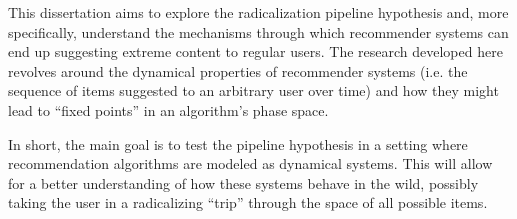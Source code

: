 This dissertation aims to explore the radicalization pipeline hypothesis and,
more specifically, understand the mechanisms through which recommender systems
can end up suggesting extreme content to regular users. The research developed
here revolves around the dynamical properties of recommender systems (i.e. the
sequence of items suggested to an arbitrary user over time) and how they might
lead to ``fixed points'' in an algorithm's phase space.

In short, the main goal is to test the pipeline hypothesis in a setting where
recommendation algorithms are modeled as dynamical systems. This will allow for
a better understanding of how these systems behave in the wild, possibly taking
the user in a radicalizing ``trip'' through the space of all possible items.
